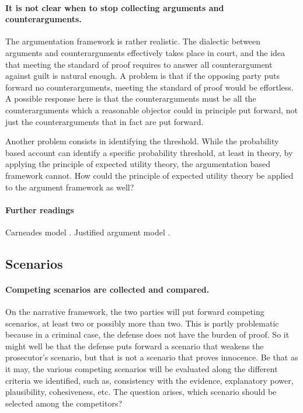 \documentclass[10pt]{article}
\begin{document}
\paragraph{It is not clear when to stop collecting arguments and counterarguments.}


The argumentation framework is rather realistic. The dialectic between arguments and 
counterarguments effectively takes place in court, and the idea that meeting the standard of proof requires to answer all 
counterargument against guilt is natural enough. A problem is that if the opposing party puts forward no counterarguments, meeting the standard of proof would be effortless. A possible response here is that the counterarguments must be all the counterarguments which a reasonable objector could in principle put forward, not just 
the counterarguments that in fact are put forward. %

Another problem consists in identifying the threshold. While the probability based account can identify a specific probability threshold, 
at least in theory, by applying the principle of expected utility theory, the argumentation based framework cannot. 
How could the principle of expected utility theory be applied to the argument framework as well?



\paragraph{Further readings}
Carneades model \citep{gordonEtal2007, gordon2009}.
Justified argument model \citep{prakkenSartor2007, prakken2009}.



\subsection{Scenarios}


\paragraph{Competing scenarios are collected and compared.}

On the narrative framework, the two parties will put forward competing scenarios, at least two or possibly more than two. This is partly problematic because in a criminal case, the defense does not have the burden of proof. So it might well be that the defense puts forward a scenario that weakens the prosecutor's scenario, but that is not 
a scenario that proves innocence. Be that as it may, the various competing scenarios will be evaluated along the different criteria we identified, such as, consistency with the evidence, explanatory power, plausibility, cohesiveness, etc. The question arises, which scenario should be selected among the competitors?
\end{document}
